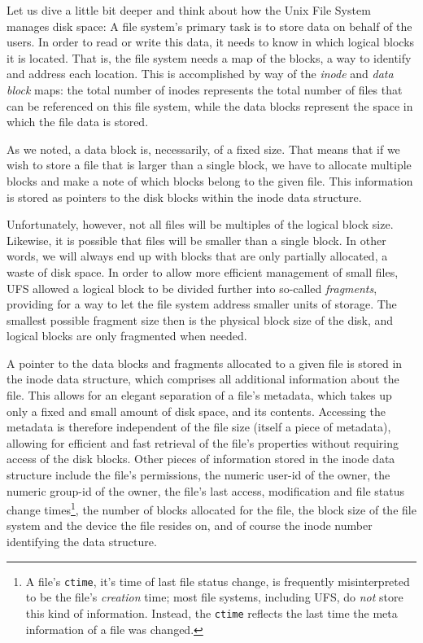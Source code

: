 Let us dive a little bit deeper and think about how
the Unix File System manages disk space:  A file
system's primary task is to store data on behalf of
the users.  In order to read or write this data, it
needs to know in which logical blocks it is located.
That is, the file system needs a map of the blocks, a
way to identify and address each location.  This is
accomplished by way of the {\em inode} and {\em data
block} maps: the total number of inodes represents the
total number of files that can be referenced on this file
system, while the data blocks represent the space in
which the file data is stored.

As we noted, a data block is, necessarily, of a fixed
size.  That means that if we wish to store a file that
is larger than a single block, we have to allocate
multiple blocks and make a note of which blocks
belong to the given file.  This information is stored
as pointers to the disk blocks within the
inode data structure.

Unfortunately, however, not all files will be
multiples of the logical block size.  Likewise, it is
possible that files will be smaller than a single
block.  In other words, we will always end up with
blocks that are only partially allocated, a waste of
disk space.  In order to allow more efficient
management of small files, UFS allowed a logical block
to be divided further into so-called {\em fragments},
providing for a way to let the file system address
smaller units of storage.  The smallest possible
fragment size then is the physical block size of the
disk, and logical blocks are only fragmented when
needed.

A pointer to the data blocks and fragments allocated
to a given file is stored in the inode data structure,
which comprises all additional information about the
file.  This allows for an elegant separation of a
file's metadata, which takes up only a fixed and small
amount of disk space, and its contents.  Accessing the
metadata is therefore independent of the file size
(itself a piece of metadata), allowing for efficient
and fast retrieval of the file's properties without
requiring access of the disk blocks.  Other pieces of
information stored in the inode data structure include
the file's permissions, the numeric user-id of the
owner, the numeric group-id of the owner, the file's
last access, modification and file status change
times\footnote{A file's {\tt ctime}, it's time of last
file status change, is frequently misinterpreted to be
the file's {\em creation} time; most file systems,
including UFS, do {\em not} store this kind of
information.  Instead, the {\tt ctime} reflects the
last time the meta information of a file was
changed.}, the number of blocks allocated for the
file, the block size of the file system and the device
the file resides on, and of course the inode number
identifying the data structure.

